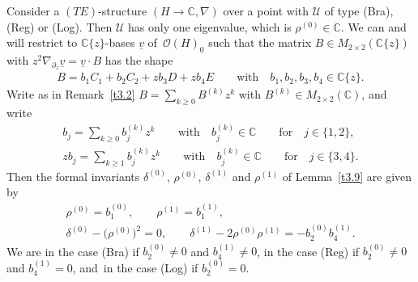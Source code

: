 \documentclass[pdftex]{sigma}%
\numberwithin{equation}{section}
\numberwithin{figure}{section}
\newcommand{\C}{{\mathbb C}}
\newcommand{\OO}{{\mathcal O}}
\newcommand{\UU}{{\mathcal U}}
\newcommand{\uuuu}{\underline}
\newcommand{\paa}{\partial}
\newcommand{\nnn}{\nabla}
\begin{document}
Consider a $(TE)$-structure $(H\to\C,\nnn)$
over a point with $\UU$ of type (Bra), (Reg) or (Log).
Then $\UU$ has only one eigenvalue, which is $\rho^{(0)}\in\C$.
We can and will restrict to $\C\{z\}$-bases $\uuuu{v}$
of~$\OO(H)_0$ such that the matrix
$B\in M_{2\times 2}(\C\{z\})$ with
$z^2\nnn_{\paa_z}\uuuu{v}=\uuuu{v}\cdot B$ has the shape
\begin{gather}\label{4.13}
B= b_1C_1+b_2C_2+zb_3D+zb_4E\qquad\text{with}\quad
b_1,b_2,b_3,b_4\in\C\{z\}.
\end{gather}
Write as in Remark~\ref{t3.2} $B=\sum_{k\geq 0}B^{(k)}z^k$
with $B^{(k)}\in M_{2\times 2}(\C)$, and write
\begin{gather}\label{4.14}
b_j=\sum_{k\geq 0}b_j^{(k)}z^k\qquad\text{with}\quad
b_j^{(k)}\in\C\qquad\text{for}\quad j\in\{1,2\},
\\
zb_j=\sum_{k\geq 1}b_j^{(k)}z^{k}\qquad\text{with}\quad
b_j^{(k)}\in\C\qquad\text{for}\quad j\in\{3,4\}.\label{4.15}
\end{gather}
Then the formal invariants $\delta^{(0)}$, $\rho^{(0)}$,
$\delta^{(1)}$ and $\rho^{(1)}$ of Lemma~\ref{t3.9} are
given by
\begin{gather*}%
\rho^{(0)}=b_1^{(0)},\qquad \rho^{(1)}=b_1^{(1)},
\\
\delta^{(0)}-\big(\rho^{(0)}\big)^2=0,\qquad
\delta^{(1)}-2\rho^{(0)}\rho^{(1)}= -b_2^{(0)}b_4^{(1)}.%
\end{gather*}
We are in the case (Bra) if $b_2^{(0)}\neq 0$ and
$b_4^{(1)}\neq 0$, in the case (Reg) if $b_2^{(0)}\neq 0$
and $b_4^{(1)}=0$,
and~in the case (Log) if $b_2^{(0)}=0$.
\end{document}
